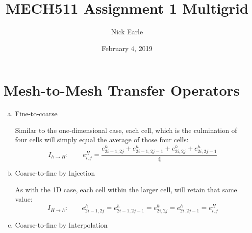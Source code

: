 \documentclass[12pt]{extarticle}
\title{MECH511 Assignment 1 Multigrid}
\author{Nick Earle}
\date{February 4, 2019}
\begin{document}
\maketitle

\section{Mesh-to-Mesh Transfer Operators}

\begin{enumerate}[(a)]
    \item Fine-to-coarse
    
        Similar to the one-dimensional case, each cell, which is the culmination of four cells will simply equal the average of those four cells:
        \begin{equation*}
            I_{h\rightarrow H}: \qquad e^H_{i,j} = \frac{e^h_{2i-1,2j}+e^h_{2i-1,2j-1}+e^h_{2i,2j}+e^h_{2i,2j-1}}{4}
        \end{equation*}
        
    \item Coarse-to-fine by Injection
    
        As with the 1D case, each cell within the larger cell, will retain that same value:
        \begin{equation*}
            I_{H\rightarrow h}: \qquad e^h_{2i-1,2j} = e^h_{2i-1,2j-1} = e^h_{2i,2j} = e^h_{2i,2j-1} = e^H_{i,j}
        \end{equation*}
        
    \item Coarse-to-fine by Interpolation
        

\end{enumerate}
\end{document}
